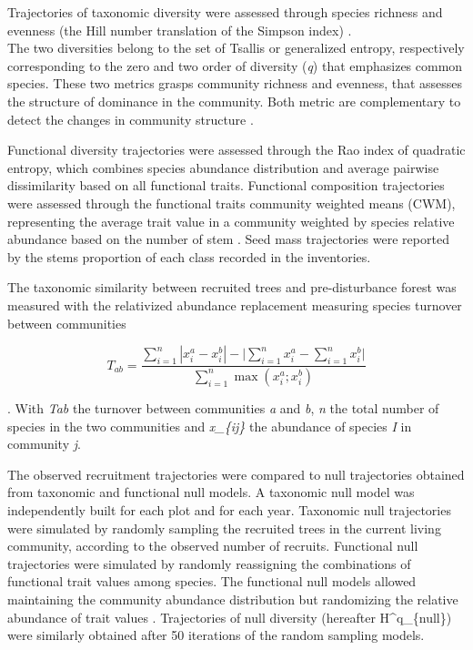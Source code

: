 \documentclass[fleqn,10pt]{ArtEcoFoG} %
\begin{document}
Trajectories of taxonomic diversity were assessed through species
richness and evenness (the Hill number translation of the Simpson index)
\citep{Chao2015, Marcon2015}.\\
The two diversities belong to the set of Tsallis or generalized entropy,
respectively corresponding to the zero and two order of diversity
(\emph{q}) that emphasizes common species. These two metrics grasps
community richness and evenness, that assesses the structure of
dominance in the community. Both metric are complementary to detect the
changes in community structure \citep{Magurran2004}.

Functional diversity trajectories were assessed through the Rao index of
quadratic entropy, which combines species abundance distribution and
average pairwise dissimilarity based on all functional traits.
Functional composition trajectories were assessed through the functional
traits community weighted means (CWM), representing the average trait
value in a community weighted by species relative abundance based on the
number of stem \citep{Diaz2007}. Seed mass trajectories were reported by
the stems proportion of each class recorded in the inventories.

The taxonomic similarity between recruited trees and pre-disturbance
forest was measured with the relativized abundance replacement measuring
species turnover between communities \citep{Podani2013a}

\begin{equation}
T_{ab}=\frac{\sum_{i=1}^{n}|x_i^a - x_i^b| - \bigg| \sum_{i=1}^{n}{x_i^a} - \sum_{i=1}^{n}{x_i^b} \bigg|}{\sum_{i=1}^{n}\max{\left( x_i^a;x_i^b \right)}}
\label{eq:formNestedness}
\end{equation}

. With \emph{Tab} the turnover between communities \emph{a} and
\emph{b}, \emph{n} the total number of species in the two communities
and \emph{x\_\{ij\}} the abundance of species \emph{I} in community
\emph{j}.

The observed recruitment trajectories were compared to null trajectories
obtained from taxonomic and functional null models. A taxonomic null
model was independently built for each plot and for each year. Taxonomic
null trajectories were simulated by randomly sampling the recruited
trees in the current living community, according to the observed number
of recruits. Functional null trajectories were simulated by randomly
reassigning the combinations of functional trait values among species.
The functional null models allowed maintaining the community abundance
distribution but randomizing the relative abundance of trait values
\citep{Mason2013}. Trajectories of null diversity (hereafter
H\^{}q\_\{null\}) were similarly obtained after 50 iterations of the
random sampling models.
\end{document}
